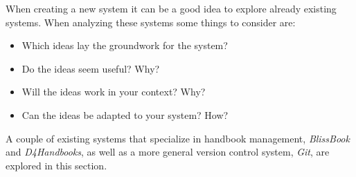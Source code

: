 When creating a new system it can be a good idea to explore already existing systems.%
 When analyzing these systems some things to consider are:

\begin{itemize}
  \item Which ideas lay the groundwork for the system?
  \item Do the ideas seem useful? Why?
  \item Will the ideas work in your context? Why?
  \item Can the ideas be adapted to your system? How?
\end{itemize}


A couple of existing systems that specialize in handbook management, \textit{BlissBook} and \textit{D4Handbooks}, as well as a more general version control system, \textit{Git}, are explored in this section.
